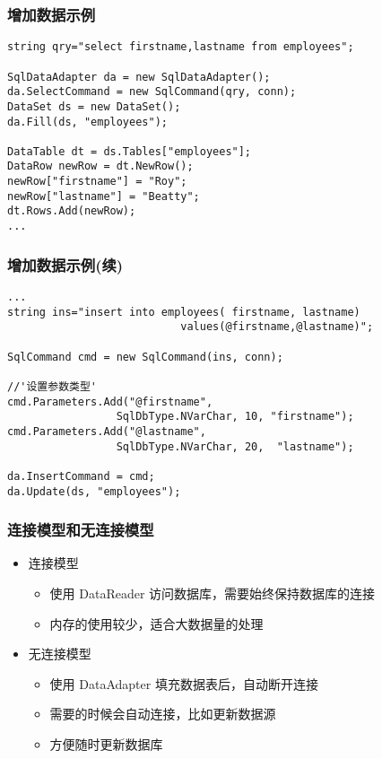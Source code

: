\begin{frame}[fragile]
\frametitle{增加数据示例} %
\begin{lstlisting}
string qry="select firstname,lastname from employees";

SqlDataAdapter da = new SqlDataAdapter();
da.SelectCommand = new SqlCommand(qry, conn);
DataSet ds = new DataSet();
da.Fill(ds, "employees");

DataTable dt = ds.Tables["employees"];
DataRow newRow = dt.NewRow();
newRow["firstname"] = "Roy";
newRow["lastname"] = "Beatty";
dt.Rows.Add(newRow);
...
\end{lstlisting}
\end{frame}

\begin{frame}[fragile]
\frametitle{增加数据示例(续)}
\begin{lstlisting}[escapeinside='']
...
string ins="insert into employees( firstname, lastname)
                           values(@firstname,@lastname)";

SqlCommand cmd = new SqlCommand(ins, conn);

//'设置参数类型'
cmd.Parameters.Add("@firstname",
                 SqlDbType.NVarChar, 10, "firstname");
cmd.Parameters.Add("@lastname",
                 SqlDbType.NVarChar, 20,  "lastname");

da.InsertCommand = cmd;
da.Update(ds, "employees");
\end{lstlisting}
\end{frame}

\begin{frame}
\frametitle{连接模型和无连接模型}
\begin{itemize}
  \setlength{\itemsep}{8pt plus 1pt}
\item 连接模型
  \begin{itemize}
    \setlength{\itemsep}{6pt plus 1pt}
  \item 使用 DataReader 访问数据库，需要始终保持数据库的连接
  \item 内存的使用较少，适合大数据量的处理
  \end{itemize}
\item 无连接模型
  \begin{itemize}
    \setlength{\itemsep}{6pt plus 1pt}
  \item 使用 DataAdapter 填充数据表后，自动断开连接
  \item 需要的时候会自动连接，比如更新数据源
  \item 方便随时更新数据库
  \end{itemize}
\end{itemize}
\end{frame}

